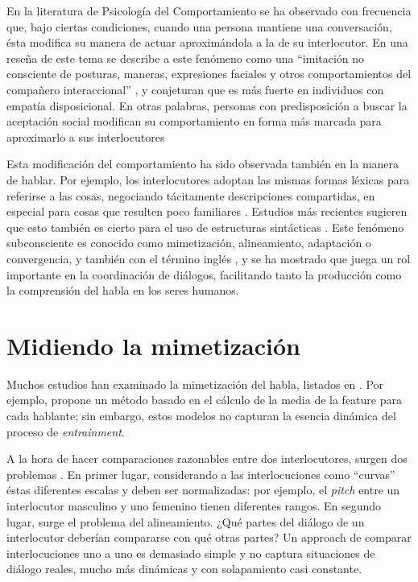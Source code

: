 En la literatura de Psicología del Comportamiento se ha observado con frecuencia que, bajo ciertas condiciones, cuando una persona mantiene una conversación, ésta modifica su manera de actuar aproximándola a la de su interlocutor. En una reseña de este tema se describe a este fenómeno como una ``imitación no consciente de posturas, maneras, expresiones faciales y otros comportamientos del compañero interaccional'' \cite[p. 893]{CHAR1999} , y conjeturan que es más fuerte en individuos con empatía disposicional. En otras palabras, personas con predisposición a buscar la aceptación social modifican su comportamiento en forma más marcada para aproximarlo a sus interlocutores


Esta modificación del comportamiento ha sido observada también en la manera de hablar. Por ejemplo, los interlocutores adoptan las mismas formas léxicas para referirse a las cosas, negociando tácitamente descripciones compartidas, en especial para cosas que resulten poco familiares \cite{BRE1996}. Estudios más recientes sugieren que esto también es cierto para el uso de estructuras sintácticas \cite{REI2006}. Este fenómeno subconsciente es conocido como mimetización, alineamiento, adaptación o convergencia, y también con el término inglés \entrainment, y se ha mostrado que juega un rol importante en la coordinación de diálogos, facilitando tanto la producción como la comprensión del habla en los seres humanos.

\section{Midiendo la mimetización}

Muchos estudios han examinado la mimetización del habla, listados en \cite{DEL2013}. Por ejemplo, \cite{LEV2012} propone un método basado en el cálculo de la media de la feature para cada hablante; sin embargo, estos modelos no capturan la esencia dinámica del proceso de \emph{entrainment}.


A la hora de hacer comparaciones razonables entre dos interlocutores, surgen dos problemas \cite{KOU2008}. En primer lugar, considerando a las interlocuciones como ``curvas'' éstas diferentes escalas y deben ser normalizadas: por ejemplo, el \emph{pitch} entre un interlocutor masculino y uno femenino tienen diferentes rangos. En segundo lugar, surge el problema del alineamiento. ¿Qué partes del diálogo de un interlocutor deberían compararse con qué otras partes? Un approach de comparar interlocuciones uno a uno es demasiado simple y no captura situaciones de diálogo reales, mucho más dinámicas y con solapamiento casi constante.

